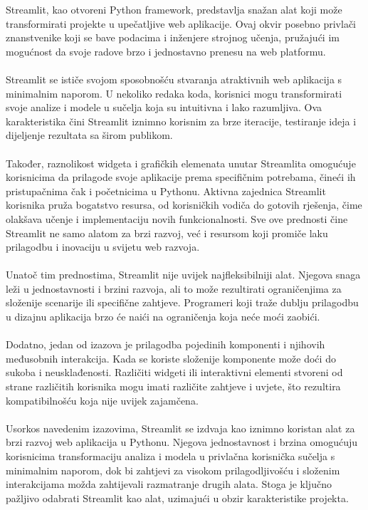 	Streamlit, kao otvoreni Python framework, predstavlja snažan alat koji može transformirati projekte u upečatljive web aplikacije. Ovaj okvir posebno privlači znanstvenike koji se bave podacima i inženjere strojnog učenja, pružajući im mogućnost da svoje radove brzo i jednostavno prenesu na web platformu.
	\\ \\
	Streamlit se ističe svojom sposobnošću stvaranja atraktivnih web aplikacija s minimalnim naporom. U nekoliko redaka koda, korisnici mogu transformirati svoje analize i modele u sučelja koja su intuitivna i lako razumljiva. Ova karakteristika čini Streamlit iznimno korisnim za brze iteracije, testiranje ideja i dijeljenje rezultata sa širom publikom.
	\\ \\
	Također, raznolikost widgeta i grafičkih elemenata unutar Streamlita omogućuje korisnicima da prilagode svoje aplikacije prema specifičnim potrebama, čineći ih pristupačnima čak i početnicima u Pythonu. Aktivna zajednica Streamlit korisnika pruža bogatstvo resursa, od korisničkih vodiča do gotovih rješenja, čime olakšava učenje i implementaciju novih funkcionalnosti. Sve ove prednosti čine Streamlit ne samo alatom za brzi razvoj, već i resursom koji promiče laku prilagodbu i inovaciju u svijetu web razvoja.
	\\ \\
	Unatoč tim prednostima, Streamlit nije uvijek najfleksibilniji alat. Njegova snaga leži u jednostavnosti i brzini razvoja, ali to može rezultirati ograničenjima za složenije scenarije ili specifične zahtjeve. Programeri koji traže dublju prilagodbu u dizajnu aplikacija brzo će naići na ograničenja koja neće moći zaobići.
	\\ \\
	Dodatno, jedan od izazova je prilagodba pojedinih komponenti i njihovih međusobnih interakcija. Kada se koriste složenije komponente može doći do sukoba i neusklađenosti. Različiti widgeti ili interaktivni elementi stvoreni od strane različitih korisnika mogu imati različite zahtjeve i uvjete, što rezultira kompatibilnošću koja nije uvijek zajamčena.
	\\ \\
	Usorkos navedenim izazovima, Streamlit se izdvaja kao iznimno koristan alat za brzi razvoj web aplikacija u Pythonu. Njegova jednostavnost i brzina omogućuju korisnicima transformaciju analiza i modela u privlačna korisnička sučelja s minimalnim naporom, dok bi zahtjevi za visokom prilagodljivošću i složenim interakcijama možda zahtijevali razmatranje drugih alata. Stoga je ključno pažljivo odabrati Streamlit kao alat, uzimajući u obzir karakteristike projekta.

